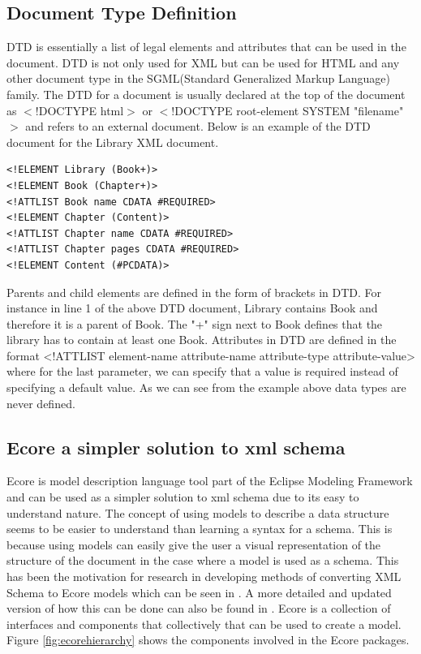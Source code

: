\documentclass{report}
\begin{document}
\subsection{Document Type Definition}

DTD is essentially a list of legal elements and attributes that can be used in the document. DTD is not only used for XML but can be used for HTML and any other document type in the SGML(Standard Generalized Markup Language) family. The DTD for a document is usually declared at the top of the document as \textsf{$<$!DOCTYPE html$>$} or \textsf{$<$!DOCTYPE root-element SYSTEM "filename"$>$} and refers to an external document. Below is an example of the DTD document for the Library XML document.
\begin{lstlisting}[caption=Library DTD ,frame=tlrb]
<!ELEMENT Library (Book+)>
<!ELEMENT Book (Chapter+)>
<!ATTLIST Book name CDATA #REQUIRED>
<!ELEMENT Chapter (Content)>
<!ATTLIST Chapter name CDATA #REQUIRED>
<!ATTLIST Chapter pages CDATA #REQUIRED>
<!ELEMENT Content (#PCDATA)>
\end{lstlisting}
Parents and child elements are defined in the form of brackets in DTD. For instance in line 1 of the above DTD document, Library contains Book and therefore it is a parent of Book. The "+" sign next to Book defines that the library has to contain at least one Book. Attributes in  DTD are defined in the format \textsf{<!ATTLIST element-name attribute-name attribute-type attribute-value>} where for the last parameter, we can specify that a value is required instead of specifying a default value. As we can see from the example above data types are never defined.

\subsection{Ecore a simpler solution to xml schema }

Ecore is model description language tool part of the Eclipse Modeling Framework \cite{eclipsemodelingf} and can be used as a simpler solution to xml schema due to its easy to understand nature. The concept of using models to describe a data structure seems to be easier to understand than learning a syntax for a schema. This is because using models can easily give the user a visual representation of the structure of the document in the case where a model is used as a schema. This has been the motivation for research in developing methods of converting XML Schema to Ecore models which can be seen in \cite{xmlschemecore}. A more detailed and updated version of how this can be done can also be found in \cite{budinsky2004eclipse}. Ecore is a collection of interfaces and components that collectively that can be used to create a model. Figure \ref{fig:ecorehierarchy} shows the components involved in the Ecore packages.
\end{document}
